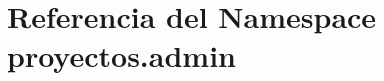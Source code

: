 \hypertarget{namespaceproyectos_1_1admin}{}\section{Referencia del Namespace proyectos.\+admin}
\label{namespaceproyectos_1_1admin}
